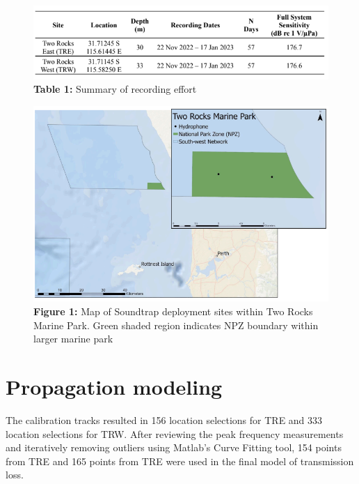 \documentclass[
  letterpaper,
  oneside,
  open=any]{scrbook}
\begin{document}
\begin{figure}[H]

{\centering \includegraphics{images/Table.1.PNG}

}

\caption{\textbf{Table 1:} Summary of recording effort}

\end{figure}%
\begin{figure}[H]

{\centering \includegraphics{images/Fig.1.PNG}

}

\caption{\textbf{Figure 1:} Map of Soundtrap deployment sites within Two
Rocks Marine Park. Green shaded region indicates NPZ boundary within
larger marine park}

\end{figure}%

\section{Propagation modeling}\label{propagation-modeling}

The calibration tracks resulted in 156 location selections for TRE and
333 location selections for TRW. After reviewing the peak frequency
measurements and iteratively removing outliers using Matlab's Curve
Fitting tool, 154 points from TRE and 165 points from TRE were used in
the final model of transmission loss.
\end{document}
